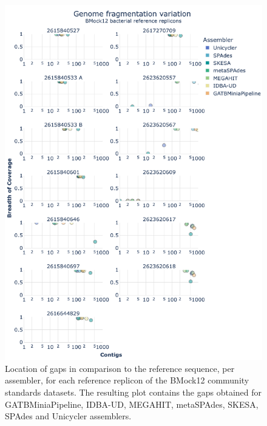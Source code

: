 \begin{figure}[]
\centering
\includegraphics[width=\textwidth]{figures/chapter 5/Supplemental Figure 9.png}
\caption{Location of gaps in comparison to the reference sequence, per assembler, for each reference replicon of the BMock12 community standards datasets. The resulting plot contains the gaps obtained for GATBMiniaPipeline, IDBA-UD, MEGAHIT, metaSPAdes, SKESA, SPAdes and Unicycler assemblers.}
\label{fig:chap5_sup_figure_9}
\end{figure}


\newpage






























